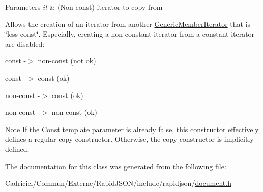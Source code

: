 \begin{DoxyParams}{Parameters}
{\em it} & (Non-\/const) iterator to copy from\\
\hline
\end{DoxyParams}
Allows the creation of an iterator from another \hyperlink{class_generic_member_iterator}{Generic\+Member\+Iterator} that is \char`\"{}less const\char`\"{}. Especially, creating a non-\/constant iterator from a constant iterator are disabled\+: \begin{DoxyItemize}
\item const -\/$>$ non-\/const (not ok) \item const -\/$>$ const (ok) \item non-\/const -\/$>$ const (ok) \item non-\/const -\/$>$ non-\/const (ok)\end{DoxyItemize}
\begin{DoxyNote}{Note}
If the {\ttfamily Const} template parameter is already {\ttfamily false}, this constructor effectively defines a regular copy-\/constructor. Otherwise, the copy constructor is implicitly defined. 
\end{DoxyNote}


The documentation for this class was generated from the following file\+:\begin{DoxyCompactItemize}
\item 
Cadriciel/\+Commun/\+Externe/\+Rapid\+J\+S\+O\+N/include/rapidjson/\hyperlink{document_8h}{document.\+h}\end{DoxyCompactItemize}
